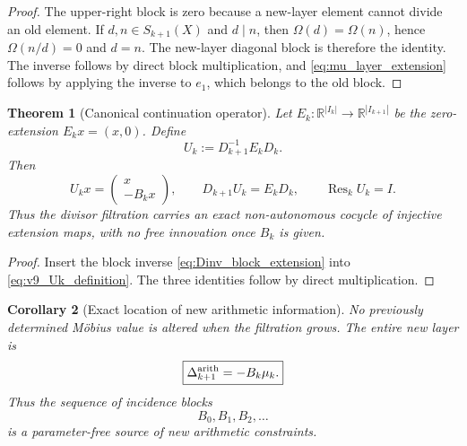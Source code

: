 \documentclass[11pt]{amsart}
\numberwithin{equation}{section}
\theoremstyle{plain}
\newtheorem{theorem}{Theorem}[section]
\newtheorem{corollary}[theorem]{Corollary}
\theoremstyle{definition}
\theoremstyle{remark}
\begin{document}
\begin{proof}
The upper-right block is zero because a new-layer element cannot divide an old element.
If $d,n\in S_{k+1}(X)$ and $d\mid n$, then
$\Omega(d)=\Omega(n)$, hence $\Omega(n/d)=0$ and $d=n$.  The new-layer diagonal block is therefore
the identity.  The inverse follows by direct block multiplication, and
\eqref{eq:mu_layer_extension} follows by applying the inverse to $e_1$, which belongs to the old
block.
\end{proof}


\begin{theorem}[Canonical continuation operator]
\label{thm:v9_canonical_arithmetic_continuation}
Let $E_k: \mathbb R^{|I_k|}\to\mathbb R^{|I_{k+1}|}$ be the zero-extension
$E_kx=(x,0)$.  Define
\begin{equation}
U_k:=D_{k+1}^{-1}E_kD_k.
\label{eq:v9_Uk_definition}
\end{equation}
Then
\begin{equation}
\boxed{
U_kx=
\begin{pmatrix}
x\\-B_kx
\end{pmatrix}},
\qquad
\boxed{D_{k+1}U_k=E_kD_k},
\qquad
\boxed{\operatorname{Res}_kU_k=I}.
\label{eq:v9_Uk_intertwining}
\end{equation}
Thus the divisor filtration carries an exact non-autonomous cocycle of injective extension maps,
with no free innovation once $B_k$ is given.
\end{theorem}

\begin{proof}
Insert the block inverse \eqref{eq:Dinv_block_extension} into
\eqref{eq:v9_Uk_definition}.  The three identities follow by direct multiplication.
\end{proof}

\begin{corollary}[Exact location of new arithmetic information]
\label{cor:new_arithmetic_information}
No previously determined M\"obius value is altered when the filtration grows.  The entire new
layer is
\begin{equation}
\boxed{\Delta_{k+1}^{\rm arith}=-B_k\mu_k.}
\label{eq:new_arithmetic_layer}
\end{equation}
Thus the sequence of incidence blocks
\[
B_0,B_1,B_2,\ldots
\]
is a parameter-free source of new arithmetic constraints.
\end{corollary}
\end{document}

